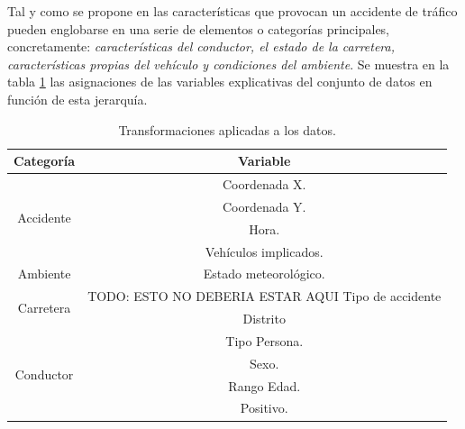 \begin{enumerate}
            Tal y como se propone en \cite{JerarquiaImagenes} las características que provocan un accidente de tráfico pueden englobarse en una serie de elementos o categorías principales, concretamente: \textit{características del conductor, el estado de la carretera, características propias del vehículo y condiciones del ambiente}. Se muestra en la tabla \ref{JerarquiaCaracteristicasTabla} las asignaciones de las variables explicativas del conjunto de datos en función de esta jerarquía.


            \begin{table}[H]
              \centering
              \begin{tabular}{ |c|c| }
                   \hline
                   \textbf{Categoría} & \textbf{Variable}\\

                   \hline
                   \multirow{4}{*}{Accidente}            & Coordenada X.\\
                                                         & Coordenada Y.\\
                                                         & Hora.\\
                                                         & Vehículos implicados.\\

                   \hline
                   \multirow{1}{*}{Ambiente}             & Estado meteorológico.\\

                   \hline
                   \multirow{2}{*}{Carretera}            & TODO: ESTO NO DEBERIA ESTAR AQUI Tipo de accidente\\
                                                         & Distrito\\

                   \hline
                   \multirow{4}{*}{Conductor}            & Tipo Persona.\\
                                                         & Sexo.\\
                                                         & Rango Edad.\\
                                                         & Positivo.\\

                   \hline
              \end{tabular}
              \caption{Transformaciones aplicadas a los datos.}
              \label{JerarquiaCaracteristicasTabla}
            \end{table}




\end{enumerate}
